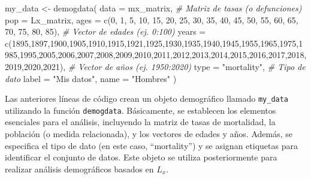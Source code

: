 \documentclass[
]{article}
\newenvironment{Shaded}{\begin{snugshade}}{\end{snugshade}}
\newcommand{\AttributeTok}[1]{\textcolor[rgb]{0.77,0.63,0.00}{#1}}
\newcommand{\CommentTok}[1]{\textcolor[rgb]{0.56,0.35,0.01}{\textit{#1}}}
\newcommand{\DecValTok}[1]{\textcolor[rgb]{0.00,0.00,0.81}{#1}}
\newcommand{\FunctionTok}[1]{\textcolor[rgb]{0.00,0.00,0.00}{#1}}
\newcommand{\NormalTok}[1]{#1}
\newcommand{\OtherTok}[1]{\textcolor[rgb]{0.56,0.35,0.01}{#1}}
\newcommand{\StringTok}[1]{\textcolor[rgb]{0.31,0.60,0.02}{#1}}
\begin{document}
\begin{Shaded}
\begin{Highlighting}[]
\NormalTok{my\_data }\OtherTok{\textless{}{-}} \FunctionTok{demogdata}\NormalTok{(}
  \AttributeTok{data =}\NormalTok{ mx\_matrix,           }\CommentTok{\# Matriz de tasas (o defunciones)}
  \AttributeTok{pop =}\NormalTok{ Lx\_matrix,}
  \AttributeTok{ages =} \FunctionTok{c}\NormalTok{(}\DecValTok{0}\NormalTok{, }\DecValTok{1}\NormalTok{, }\DecValTok{5}\NormalTok{, }\DecValTok{10}\NormalTok{, }\DecValTok{15}\NormalTok{, }\DecValTok{20}\NormalTok{, }\DecValTok{25}\NormalTok{, }\DecValTok{30}\NormalTok{, }\DecValTok{35}\NormalTok{, }\DecValTok{40}\NormalTok{, }\DecValTok{45}\NormalTok{, }\DecValTok{50}\NormalTok{, }\DecValTok{55}\NormalTok{, }\DecValTok{60}\NormalTok{, }\DecValTok{65}\NormalTok{, }\DecValTok{70}\NormalTok{, }\DecValTok{75}\NormalTok{, }\DecValTok{80}\NormalTok{, }\DecValTok{85}\NormalTok{),       }\CommentTok{\# Vector de edades (ej. 0:100)}
  \AttributeTok{years =} \FunctionTok{c}\NormalTok{(}\DecValTok{1895}\NormalTok{,}\DecValTok{1897}\NormalTok{,}\DecValTok{1900}\NormalTok{,}\DecValTok{1905}\NormalTok{,}\DecValTok{1910}\NormalTok{,}\DecValTok{1915}\NormalTok{,}\DecValTok{1921}\NormalTok{,}\DecValTok{1925}\NormalTok{,}\DecValTok{1930}\NormalTok{,}\DecValTok{1935}\NormalTok{,}\DecValTok{1940}\NormalTok{,}\DecValTok{1945}\NormalTok{,}\DecValTok{1955}\NormalTok{,}\DecValTok{1965}\NormalTok{,}\DecValTok{1975}\NormalTok{,}\DecValTok{1985}\NormalTok{,}\DecValTok{1995}\NormalTok{,}\DecValTok{2005}\NormalTok{,}\DecValTok{2006}\NormalTok{,}\DecValTok{2007}\NormalTok{,}\DecValTok{2008}\NormalTok{,}\DecValTok{2009}\NormalTok{,}\DecValTok{2010}\NormalTok{,}\DecValTok{2011}\NormalTok{,}\DecValTok{2012}\NormalTok{,}\DecValTok{2013}\NormalTok{,}\DecValTok{2014}\NormalTok{,}\DecValTok{2015}\NormalTok{,}\DecValTok{2016}\NormalTok{,}\DecValTok{2017}\NormalTok{,}\DecValTok{2018}\NormalTok{,}\DecValTok{2019}\NormalTok{,}\DecValTok{2020}\NormalTok{,}\DecValTok{2021}\NormalTok{),        }\CommentTok{\# Vector de años (ej. 1950:2020)}
  \AttributeTok{type =} \StringTok{"mortality"}\NormalTok{,  }\CommentTok{\# Tipo de dato}
  \AttributeTok{label =} \StringTok{"Mis datos"}\NormalTok{,}
  \AttributeTok{name =} \StringTok{"Hombres"}
\NormalTok{)}
\end{Highlighting}
\end{Shaded}

Las anteriores líneas de código crean un objeto demográfico llamado
\texttt{my\_data} utilizando la función \texttt{demogdata}. Básicamente,
se establecen los elementos esenciales para el análisis, incluyendo la
matriz de tasas de mortalidad, la población (o medida relacionada), y
los vectores de edades y años. Además, se especifica el tipo de dato (en
este caso, ``mortality'') y se asignan etiquetas para identificar el
conjunto de datos. Este objeto se utiliza posteriormente para realizar
análisis demográficos basados en \(L_x\).
\end{document}
